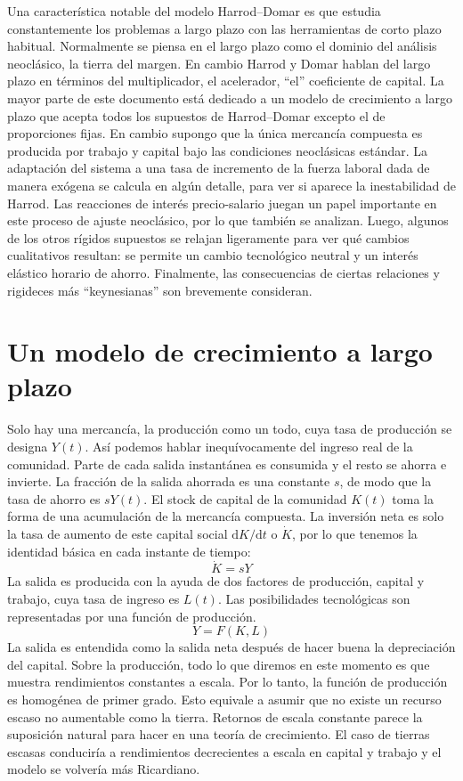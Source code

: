 Una característica notable del modelo Harrod--Domar es que estudia constantemente los problemas a largo plazo con las herramientas de corto plazo habitual. Normalmente se piensa en el largo plazo como el dominio del análisis neoclásico, la tierra del margen. En cambio Harrod y Domar hablan del largo plazo en términos del multiplicador, el acelerador, ``el'' coeficiente de capital. La mayor parte de este documento está dedicado a un modelo de crecimiento a largo plazo que acepta todos los supuestos de Harrod--Domar excepto el de proporciones fijas. En cambio supongo que la única mercancía compuesta es producida por trabajo y capital bajo las condiciones neoclásicas estándar. La adaptación del sistema a una tasa de incremento de la fuerza laboral dada de manera exógena se calcula en algún detalle, para ver si aparece la inestabilidad de Harrod. Las reacciones de interés precio-salario juegan un papel importante en este proceso de ajuste neoclásico, por lo que también se analizan. Luego, algunos de los otros rígidos supuestos se relajan ligeramente para ver qué cambios cualitativos resultan: se permite un cambio tecnológico neutral y un interés elástico horario de ahorro. Finalmente, las consecuencias de ciertas relaciones y rigideces más ``keynesianas'' son brevemente consideran.

\section{Un modelo de crecimiento a largo plazo}
Solo hay una mercancía, la producción como un todo, cuya tasa de producción se designa $Y\left(t\right)$. Así podemos hablar inequívocamente del ingreso real de la comunidad. Parte de cada salida instantánea es consumida y el resto se ahorra e invierte. La fracción de la salida ahorrada es una constante $s$, de modo que la tasa de ahorro es $sY\left(t\right)$. El stock de capital de la comunidad $K\left(t\right)$ toma la forma de una acumulación de la mercancía compuesta. La inversión neta es solo la tasa de
aumento de este capital social $\mathrm{d}K/\mathrm{d}t$ o $\dot{K}$, por lo que tenemos la identidad básica en cada instante de tiempo:
\begin{equation}\label{eq:first}
\dot{K}=sY
\end{equation}
La salida es producida con la ayuda de dos factores de producción, capital y trabajo, cuya tasa de ingreso es $L\left(t\right)$. Las posibilidades tecnológicas son representadas por una función de producción.
\begin{equation}\label{eq:second}
Y=F\left(K,L\right)
\end{equation}
La salida es entendida como la salida neta después de hacer buena la depreciación del capital. Sobre la producción, todo lo que diremos en este momento es que muestra rendimientos constantes a escala. Por lo tanto, la función de producción es homogénea de primer grado. Esto equivale a asumir que no existe un recurso escaso no aumentable como la tierra. Retornos de escala constante parece la suposición natural para hacer en una teoría de crecimiento. El caso de tierras escasas conduciría a rendimientos decrecientes a
escala en capital y trabajo y el modelo se volvería más Ricardiano.

